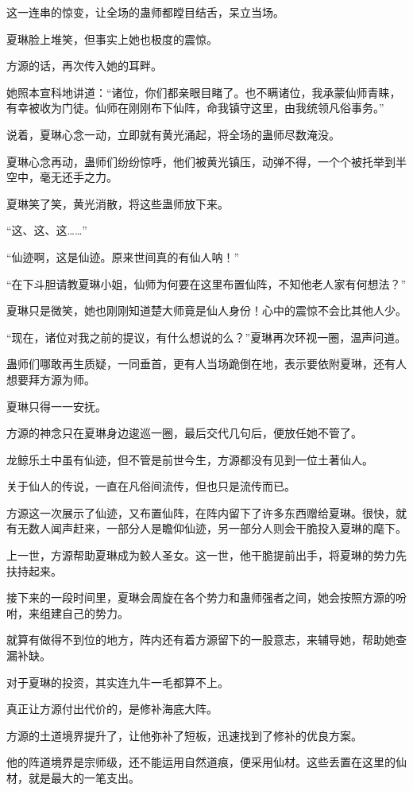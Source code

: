 \begin{this_body}
这一连串的惊变，让全场的蛊师都瞠目结舌，呆立当场。

夏琳脸上堆笑，但事实上她也极度的震惊。

方源的话，再次传入她的耳畔。

她照本宣科地讲道：“诸位，你们都亲眼目睹了。也不瞒诸位，我承蒙仙师青睐，有幸被收为门徒。仙师在刚刚布下仙阵，命我镇守这里，由我统领凡俗事务。”

说着，夏琳心念一动，立即就有黄光涌起，将全场的蛊师尽数淹没。

夏琳心念再动，蛊师们纷纷惊呼，他们被黄光镇压，动弹不得，一个个被托举到半空中，毫无还手之力。

夏琳笑了笑，黄光消散，将这些蛊师放下来。

“这、这、这……”

“仙迹啊，这是仙迹。原来世间真的有仙人呐！”

“在下斗胆请教夏琳小姐，仙师为何要在这里布置仙阵，不知他老人家有何想法？”

夏琳只是微笑，她也刚刚知道楚大师竟是仙人身份！心中的震惊不会比其他人少。

“现在，诸位对我之前的提议，有什么想说的么？”夏琳再次环视一圈，温声问道。

蛊师们哪敢再生质疑，一同垂首，更有人当场跪倒在地，表示要依附夏琳，还有人想要拜方源为师。

夏琳只得一一安抚。

方源的神念只在夏琳身边逡巡一圈，最后交代几句后，便放任她不管了。

龙鲸乐土中虽有仙迹，但不管是前世今生，方源都没有见到一位土著仙人。

关于仙人的传说，一直在凡俗间流传，但也只是流传而已。

方源这一次展示了仙迹，又布置仙阵，在阵内留下了许多东西赠给夏琳。很快，就有无数人闻声赶来，一部分人是瞻仰仙迹，另一部分人则会干脆投入夏琳的麾下。

上一世，方源帮助夏琳成为鲛人圣女。这一世，他干脆提前出手，将夏琳的势力先扶持起来。

接下来的一段时间里，夏琳会周旋在各个势力和蛊师强者之间，她会按照方源的吩咐，来组建自己的势力。

就算有做得不到位的地方，阵内还有着方源留下的一股意志，来辅导她，帮助她查漏补缺。

对于夏琳的投资，其实连九牛一毛都算不上。

真正让方源付出代价的，是修补海底大阵。

方源的土道境界提升了，让他弥补了短板，迅速找到了修补的优良方案。

他的阵道境界是宗师级，还不能运用自然道痕，便采用仙材。这些丢置在这里的仙材，就是最大的一笔支出。


\end{this_body}
